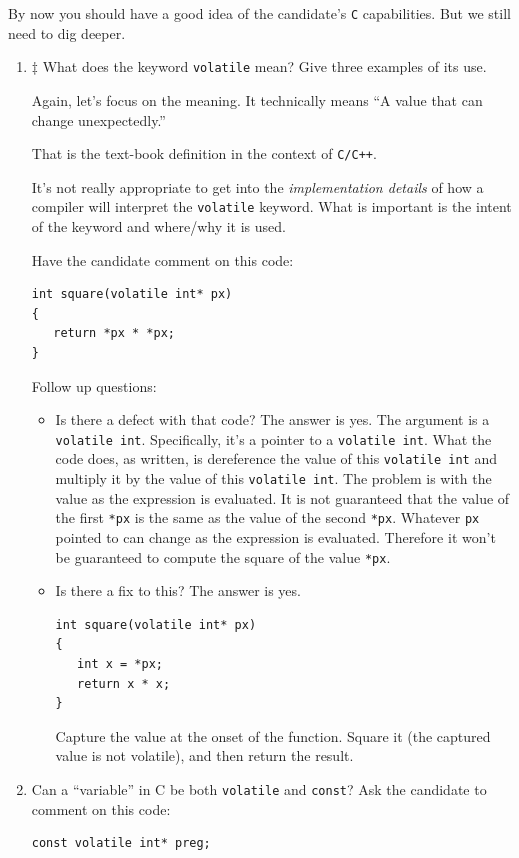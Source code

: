 \documentclass[12pt]{article}
\begin{document}
By now you should have a good idea of the candidate's {\texttt{C}} capabilities.
But we still need to dig deeper.
\par
\begin{enumerate}
\item $\ddagger$ What does the keyword {\texttt{volatile}} mean?  Give three examples
of its use.

Again, let's focus on the meaning.  It technically means ``A value
that can change unexpectedly.''

That is the text-book definition in the context of {\texttt{C/C++}}.

It's not really appropriate to get into the {\textit{implementation details}}
of how a compiler will interpret the {\texttt{volatile}} keyword.  What is
important is the intent of the keyword and where/why it is used.

Have the candidate comment on this code:

\begin{lstlisting}
int square(volatile int* px)
{
   return *px * *px;
}
\end{lstlisting}

Follow up questions:
\begin{itemize}
\item Is there a defect with that code?  The answer is yes.
The argument is a {\texttt{volatile int}}. Specifically, it's
a pointer to a {\texttt{volatile int}}.  What the code does,
as written, is dereference the value of this {\texttt{volatile int}}
and multiply it by the value of this {\texttt{volatile int}}. 
The problem is with the value as the expression is evaluated.
It is not guaranteed that the value of the first {\texttt{*px}}
is the same as the value of the second {\texttt{*px}}.  
Whatever {\texttt{px}} pointed to can change as the expression
is evaluated.  Therefore it won't be guaranteed to compute the
square of the value {\texttt{*px}}.
\item Is there a fix to this?  The answer is yes.
\begin{lstlisting}
int square(volatile int* px)
{
   int x = *px;
   return x * x;
}
\end{lstlisting}
Capture the value at the onset of the function. Square it
(the captured value is not volatile), and then return the
result.
\end{itemize}

\item Can a ``variable'' in C be both {\texttt{volatile}}
and {\texttt{const}}?
Ask the candidate to comment on this code:
\begin{lstlisting}
const volatile int* preg;
\end{lstlisting}


\end{enumerate}
\end{document}
